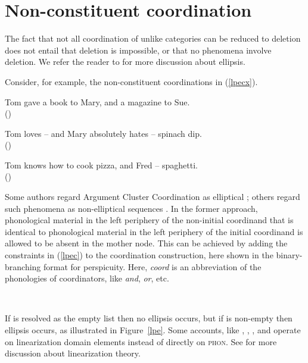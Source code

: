 \section{Non-constituent coordination}
\label{sec-non-constituent-coordination}

The fact that not all coordination of unlike categories can be reduced to deletion  does not entail that
deletion is impossible, or that no phenomena involve deletion.
We refer the reader to  for more discussion about ellipsis.

Consider, for example, the non-constituent coordinations in (\ref{lpecx}). 

\eal
\label{lpecx}
\ex 
\label{ex-tom-gave-a-book-to-mary-and-a-magazine-to-sue}
Tom gave a book to Mary, and a magazine to Sue.\\
()

\ex Tom loves -- and Mary absolutely hates -- spinach dip.\\
()

\ex Tom knows how to cook pizza, and Fred -- spaghetti.\\
()

\zl

Some authors regard Argument Cluster Coordination as elliptical \citep{yatabe01,Crysmann:04,Beavers}; others
regard such phenomena as non-elliptical sequences \citep{Mouret:06}.
In the former approach,  phonological material in the left periphery of the non-initial coordinand that is identical to
phonological material in the left periphery of the initial coordinand is allowed to be absent in the mother node.
This can be achieved by adding the constraints in (\ref{lpec}) to the coordination construction, here shown in the binary-branching format for perspicuity.
Here, {\it coord} is an abbreviation of the phonologies of coordinators, like
{\it and}, {\it or}, etc.

\ea
\label{lpec}
 \impl\\
\z

\noindent
If  is resolved as the empty list then no ellipsis occurs, but if  is non-empty then ellipsis occurs, as illustrated in Figure~\ref{lpe}. 
Some accounts, like  \citet{yatabe01}, \citet{Crysmann:04}, \citet{Beavers}, and \citet{chaveslp} operate on
linearization domain\label{page-linearization-domains-in-coordination-two} elements instead of directly on \textsc{phon}.  
See  for more discussion about linearization theory.



